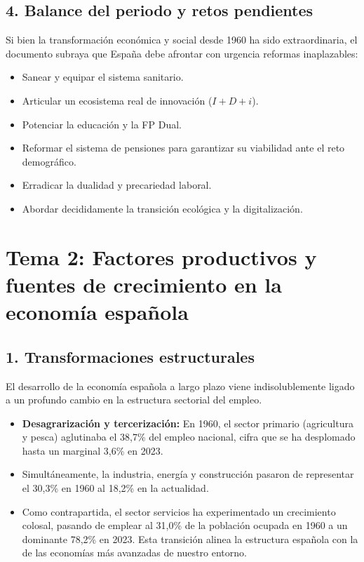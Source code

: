 \subsection*{4. Balance del periodo y retos pendientes}

Si bien la transformación económica y social desde 1960 ha sido extraordinaria, el documento subraya que España debe afrontar con urgencia reformas inaplazables:

\begin{itemize}
  \item Sanear y equipar el sistema sanitario.
  \item Articular un ecosistema real de innovación ($I+D+i$).
  \item Potenciar la educación y la FP Dual.
  \item Reformar el sistema de pensiones para garantizar su viabilidad ante el reto demográfico.
  \item Erradicar la dualidad y precariedad laboral.
  \item Abordar decididamente la transición ecológica y la digitalización.
\end{itemize}


\clearpage
\section*{Tema 2: Factores productivos y fuentes de crecimiento en la economía española}

\subsection*{1. Transformaciones estructurales}

El desarrollo de la economía española a largo plazo viene indisolublemente ligado a un profundo cambio en la estructura sectorial del empleo.

\begin{itemize}
  \item \textbf{Desagrarización y tercerización:} En 1960, el sector primario (agricultura y pesca) aglutinaba el 38,7\% del empleo nacional, cifra que se ha desplomado hasta un marginal 3,6\% en 2023.
  \item Simultáneamente, la industria, energía y construcción pasaron de representar el 30,3\% en 1960 al 18,2\% en la actualidad.
  \item Como contrapartida, el sector servicios ha experimentado un crecimiento colosal, pasando de emplear al 31,0\% de la población ocupada en 1960 a un dominante 78,2\% en 2023. Esta transición alinea la estructura española con la de las economías más avanzadas de nuestro entorno.
\end{itemize}

